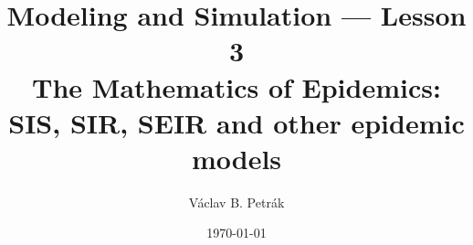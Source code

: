 \documentclass[11pt]{beamer}
\title{
Modeling and Simulation --- Lesson 3\\
\textbf{The Mathematics of Epidemics:\\
SIS, SIR,  SEIR and other epidemic models}}
\author{Václav B. Petrák}
\institute{Faculty of Biomedical Engineering\\
Czech Technical University}
\date{\today}
\begin{document}
\begin{frame}
  \titlepage
\end{frame}





\end{document}
